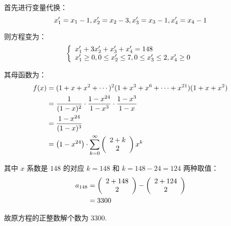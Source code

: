 \documentclass[cn, hazy, blue, normal, 12pt]{elegantnote}
\begin{document}
\begin{solution}[print=true]

    首先进行变量代换：
    \begin{equation}
        \notag
        x_1^{\prime} = x_1-1, x_2^{\prime} = x_2-3, x_3^{\prime} = x_3-1, x_4^{\prime} = x_4-1
    \end{equation}

    则方程变为：
    \begin{equation}
        \notag
        \left\{
        \begin{array}{l}
            x_1^{\prime} + 3 x_2^{\prime} + x_3^{\prime} + x_4^{\prime} = 148 \\
            x_1^{\prime} \geq 0, 0 \leq x_2^{\prime} \leq 7, 0 \leq x_3^{\prime} \leq 2, x_4^{\prime} \geq 0
        \end{array}
        \right.
    \end{equation}

    其母函数为：
    \begin{equation}
        \notag
        \begin{aligned}
            f(x) & = (1+x+x^2+\cdots)^2 (1+x^3+x^6+\cdots+x^{21}) (1+x+x^2)                                                     \\
                 & = \dfrac{1}{(1-x)^2} \cdot \dfrac{1-x^{24}}{1-x^3} \cdot\dfrac{1-x^3}{1-x}                                   \\
                 & = \dfrac{1-x^{24}}{(1-x)^3}                                                                                  \\
                 & = \left(1-x^{24}\right) \cdot \sum_{k=0}^{\infty} {\left( \begin{array}{c} 2+k \\ 2 \end{array} \right) x^k}
        \end{aligned}
    \end{equation}

    其中 $x$ 系数是 $148$ 的对应 $k=148$ 和 $k=148-24=124$ 两种取值：
    \begin{equation}
        \notag
        \begin{aligned}
            a_{148} & = \left( \begin{array}{c} 2+148 \\ 2 \end{array} \right) - \left( \begin{array}{c} 2+124 \\ 2 \end{array} \right) \\
                    & = 3300
        \end{aligned}
    \end{equation}

    故原方程的正整数解个数为 $3300$.

\end{solution}
\end{document}
